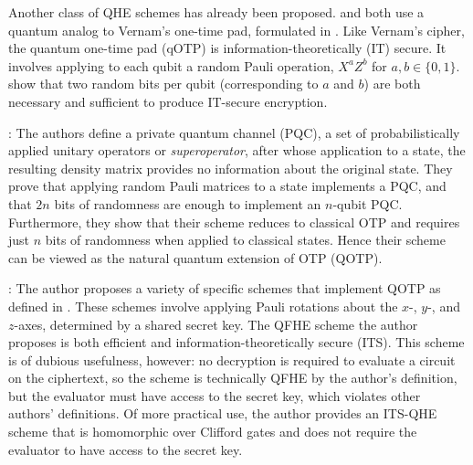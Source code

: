 \documentclass{article}
\begin{document}
Another class of QHE schemes has already been proposed. \citet{broadbent2015}
and \citet{dulek2016} both use a quantum analog to Vernam’s one-time pad,
formulated in \citet{ambainis2000}. Like Vernam’s cipher, the quantum one-time
pad (qOTP) is information-theoretically (IT) secure. It involves applying to
each qubit a random Pauli operation, $X^aZ^b$ for $a,b \in \{0,1\}$.
\citet{ambainis2000} show that two random bits per qubit (corresponding to $a$
and $b$) are both necessary and sufficient to produce IT-secure encryption.

\citet{ambainis2000}: The authors define a private quantum channel (PQC), a set
of probabilistically applied unitary operators or \textit{superoperator}, after
whose application to a state, the resulting density matrix provides no
information about the original state. They prove that applying random Pauli
matrices to a state implements a PQC, and that $2n$ bits of randomness are
enough to implement an $n$-qubit PQC. Furthermore, they show that their scheme
reduces to classical OTP and requires just $n$ bits of randomness when applied
to classical states. Hence their scheme can be viewed as the natural quantum
extension of OTP (QOTP).

\citet{liang2014}: The author proposes a variety of specific schemes that
implement QOTP as defined in \cite{ambainis2000}. These schemes involve applying
Pauli rotations about the $x$-, $y$-, and $z$-axes, determined by a shared
secret key. The QFHE scheme the author proposes is both efficient and
information-theoretically secure (ITS). This scheme is of dubious usefulness,
however: no decryption is required to evaluate a circuit on the ciphertext, so
the scheme is technically QFHE by the author's definition, but the evaluator
must have access to the secret key, which violates other authors' definitions.
Of more practical use, the author provides an ITS-QHE scheme that is homomorphic
over Clifford gates and does not require the evaluator to have access to the
secret key.
\end{document}

